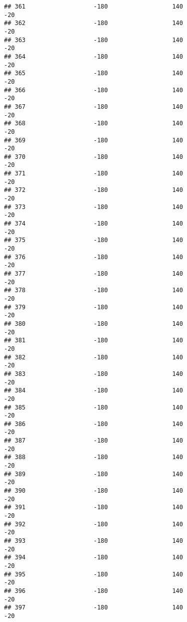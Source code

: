 \documentclass[]{article}
\begin{document}
\begin{verbatim}
## 361                   -180                  140                  -20
## 362                   -180                  140                  -20
## 363                   -180                  140                  -20
## 364                   -180                  140                  -20
## 365                   -180                  140                  -20
## 366                   -180                  140                  -20
## 367                   -180                  140                  -20
## 368                   -180                  140                  -20
## 369                   -180                  140                  -20
## 370                   -180                  140                  -20
## 371                   -180                  140                  -20
## 372                   -180                  140                  -20
## 373                   -180                  140                  -20
## 374                   -180                  140                  -20
## 375                   -180                  140                  -20
## 376                   -180                  140                  -20
## 377                   -180                  140                  -20
## 378                   -180                  140                  -20
## 379                   -180                  140                  -20
## 380                   -180                  140                  -20
## 381                   -180                  140                  -20
## 382                   -180                  140                  -20
## 383                   -180                  140                  -20
## 384                   -180                  140                  -20
## 385                   -180                  140                  -20
## 386                   -180                  140                  -20
## 387                   -180                  140                  -20
## 388                   -180                  140                  -20
## 389                   -180                  140                  -20
## 390                   -180                  140                  -20
## 391                   -180                  140                  -20
## 392                   -180                  140                  -20
## 393                   -180                  140                  -20
## 394                   -180                  140                  -20
## 395                   -180                  140                  -20
## 396                   -180                  140                  -20
## 397                   -180                  140                  -20

\end{verbatim}
\end{document}
